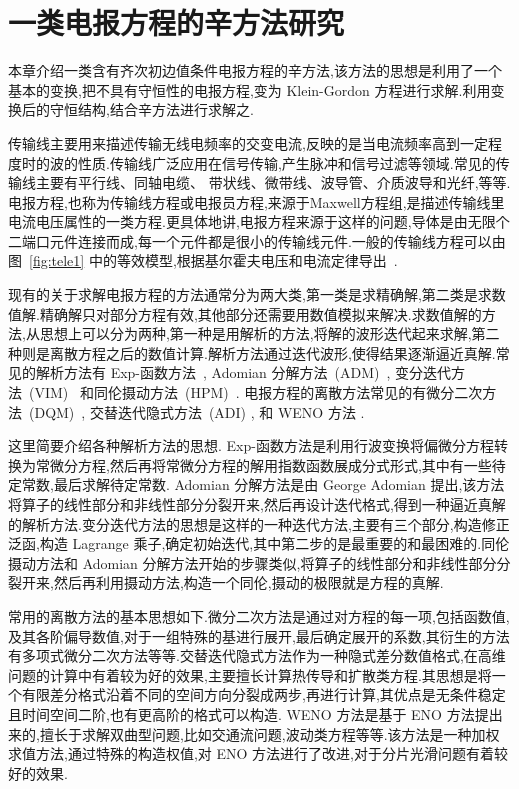 \chapter{一类电报方程的辛方法研究}

本章介绍一类含有齐次初边值条件电报方程的辛方法,该方法的思想是利用了一个基本的变换,把不具有守恒性的电报方程,变为 Klein-Gordon 方程进行求解.利用变换后的守恒结构,结合辛方法进行求解之.

传输线主要用来描述传输无线电频率的交变电流,反映的是当电流频率高到一定程度时的波的性质.传输线广泛应用在信号传输,产生脉冲和信号过滤等领域.常见的传输线主要有平行线、同轴电缆、
带状线、微带线、波导管、介质波导和光纤,等等.电报方程,也称为传输线方程或电报员方程,来源于Maxwell方程组,是描述传输线里电流电压属性的一类方程.更具体地讲,电报方程来源于这样的问题,导体是由无限个二端口元件连接而成,每一个元件都是很小的传输线元件.一般的传输线方程可以由图~\ref{fig:tele1} 中的等效模型,根据基尔霍夫电压和电流定律导出~\cite{ludwig2000rf}.

现有的关于求解电报方程的方法通常分为两大类,第一类是求精确解,第二类是求数值解.精确解只对部分方程有效,其他部分还需要用数值模拟来解决.求数值解的方法,从思想上可以分为两种,第一种是用解析的方法,将解的波形迭代起来求解,第二种则是离散方程之后的数值计算.解析方法通过迭代波形,使得结果逐渐逼近真解.常见的解析方法有 Exp-函数方法~\cite{naher2011exp}, Adomian 分解方法~(ADM)~\cite{adomian1988areview,sheikholeslami2012analytical}, 变分迭代方法~(VIM)~\cite{wu2013variational} 和同伦摄动方法~(HPM)~\cite{sheikholeslami2012homotopy}. 电报方程的离散方法常见的有微分二次方法~(DQM)~\cite{jiwari2012numerical}, 交替迭代隐式方法~(ADI) \cite{cui2013convergence}, 和 WENO 方法 \cite{borges2008improved,shen2014improvement}.

这里简要介绍各种解析方法的思想. Exp-函数方法是利用行波变换将偏微分方程转换为常微分方程,然后再将常微分方程的解用指数函数展成分式形式,其中有一些待定常数,最后求解待定常数. Adomian 分解方法是由 George Adomian 提出,该方法将算子的线性部分和非线性部分分裂开来,然后再设计迭代格式,得到一种逼近真解的解析方法.变分迭代方法的思想是这样的一种迭代方法,主要有三个部分,构造修正泛函,构造 Lagrange 乘子,确定初始迭代,其中第二步的是最重要的和最困难的.同伦摄动方法和 Adomian 分解方法开始的步骤类似,将算子的线性部分和非线性部分分裂开来,然后再利用摄动方法,构造一个同伦,摄动的极限就是方程的真解.

常用的离散方法的基本思想如下.微分二次方法是通过对方程的每一项,包括函数值,及其各阶偏导数值,对于一组特殊的基进行展开,最后确定展开的系数,其衍生的方法有多项式微分二次方法等等.交替迭代隐式方法作为一种隐式差分数值格式,在高维问题的计算中有着较为好的效果,主要擅长计算热传导和扩散类方程.其思想是将一个有限差分格式沿着不同的空间方向分裂成两步,再进行计算,其优点是无条件稳定且时间空间二阶,也有更高阶的格式可以构造. WENO 方法是基于 ENO 方法提出来的,擅长于求解双曲型问题,比如交通流问题,波动类方程等等.该方法是一种加权求值方法,通过特殊的构造权值,对 ENO 方法进行了改进,对于分片光滑问题有着较好的效果.

